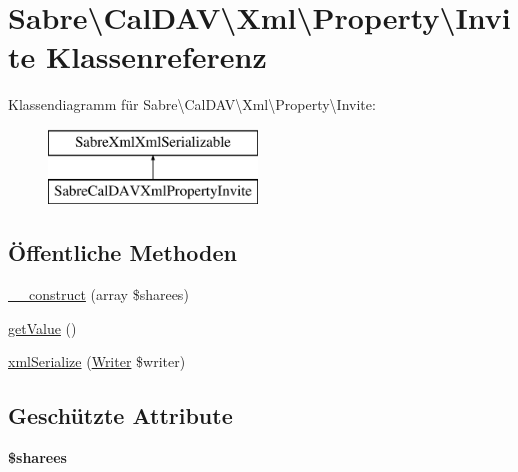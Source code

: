 \hypertarget{class_sabre_1_1_cal_d_a_v_1_1_xml_1_1_property_1_1_invite}{}\section{Sabre\textbackslash{}Cal\+D\+AV\textbackslash{}Xml\textbackslash{}Property\textbackslash{}Invite Klassenreferenz}
\label{class_sabre_1_1_cal_d_a_v_1_1_xml_1_1_property_1_1_invite}
Klassendiagramm für Sabre\textbackslash{}Cal\+D\+AV\textbackslash{}Xml\textbackslash{}Property\textbackslash{}Invite\+:\begin{figure}[H]
\begin{center}
\leavevmode
\includegraphics[height=2.000000cm]{class_sabre_1_1_cal_d_a_v_1_1_xml_1_1_property_1_1_invite}
\end{center}
\end{figure}
\subsection*{Öffentliche Methoden}
\begin{DoxyCompactItemize}
\item 
\mbox{\hyperlink{class_sabre_1_1_cal_d_a_v_1_1_xml_1_1_property_1_1_invite_ae13c36e59aa45e9099c80103974940fb}{\+\_\+\+\_\+construct}} (array \$sharees)
\item 
\mbox{\hyperlink{class_sabre_1_1_cal_d_a_v_1_1_xml_1_1_property_1_1_invite_a00305722787343addc6619771b45ab05}{get\+Value}} ()
\item 
\mbox{\hyperlink{class_sabre_1_1_cal_d_a_v_1_1_xml_1_1_property_1_1_invite_ab2d4e8c76564b1715c7f1145a796addc}{xml\+Serialize}} (\mbox{\hyperlink{class_sabre_1_1_xml_1_1_writer}{Writer}} \$writer)
\end{DoxyCompactItemize}
\subsection*{Geschützte Attribute}
\begin{DoxyCompactItemize}
\item 
\mbox{\label{class_sabre_1_1_cal_d_a_v_1_1_xml_1_1_property_1_1_invite_ac3a078fdc3bcc105cb76ba7c93634d2b}} 
{\bfseries \$sharees}
\end{DoxyCompactItemize}


